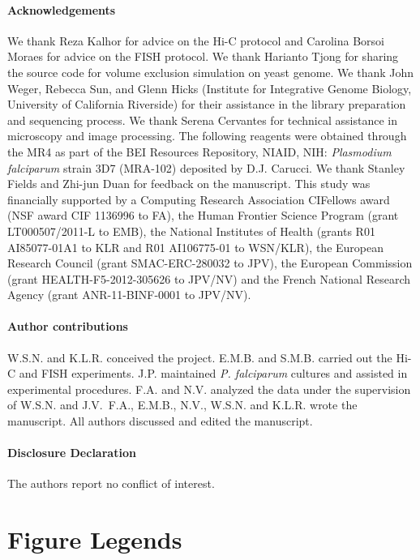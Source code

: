\documentclass[10pt]{article}
\begin{document}
\paragraph{Acknowledgements}
We thank Reza Kalhor for advice on the Hi-C protocol and Carolina Borsoi Moraes for advice on the FISH protocol. We thank Harianto Tjong for sharing the source code for volume exclusion simulation on yeast genome. We thank John Weger, Rebecca Sun, and Glenn Hicks (Institute for Integrative Genome Biology, University of California Riverside) for their assistance in the library preparation and sequencing process. We thank Serena Cervantes for technical assistance in microscopy and image processing. The following reagents were obtained through the MR4 as part of the BEI Resources Repository, NIAID, NIH: \emph{Plasmodium falciparum} strain 3D7 (MRA-102) deposited by D.J. Carucci. We thank Stanley Fields and Zhi-jun Duan for feedback on the manuscript. This study was financially supported by a Computing Research Association CIFellows award (NSF award CIF 1136996 to FA), the Human Frontier Science Program (grant LT000507/2011-L to EMB), the National Institutes of Health (grants R01 AI85077-01A1 to KLR and R01 AI106775-01 to WSN/KLR), the European Research Council (grant SMAC-ERC-280032 to JPV), the European Commission (grant HEALTH-F5-2012-305626 to JPV/NV) and the French National Research Agency (grant ANR-11-BINF-0001 to JPV/NV).

\paragraph{Author contributions}
W.S.N. and K.L.R. conceived the project. E.M.B. and S.M.B. carried out the Hi-C and FISH experiments. J.P. maintained {\em P. falciparum} cultures and assisted in experimental procedures. F.A. and N.V. analyzed the data under the supervision of W.S.N. and J.V.\ F.A., E.M.B., N.V., W.S.N. and K.L.R. wrote the manuscript. All authors discussed and edited the manuscript.

\paragraph{Disclosure Declaration}
The authors report no conflict of interest.


\clearpage
\section*{Figure Legends}
\end{document}
